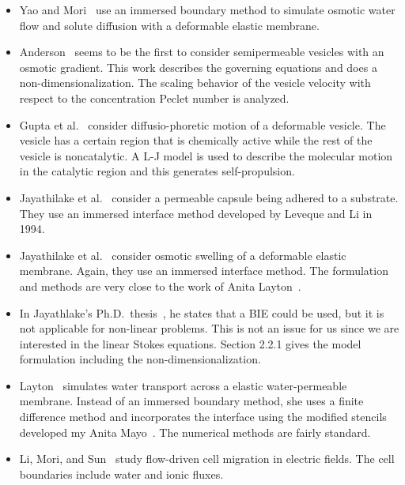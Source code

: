 \documentclass[twoside,twocolumn,9pt]{article}
\begin{document}
\begin{itemize}
  \item Yao and Mori~\cite{yao-mor2017} use an immersed boundary method
    to simulate osmotic water flow and solute diffusion with a
    deformable elastic membrane.

  \item Anderson~\cite{and1983} seems to be the first to consider
    semipermeable vesicles with an osmotic gradient. This work describes
    the governing equations and does a non-dimensionalization. The
    scaling behavior of the vesicle velocity with respect to the
    concentration Peclet number is analyzed.

  \item Gupta et al.~\cite{gup-sre-tha2015} consider diffusio-phoretic
    motion of a deformable vesicle. The vesicle has a certain region
    that is chemically active while the rest of the vesicle is
    noncatalytic. A L-J model is used to describe the molecular motion
    in the catalytic region and this generates self-propulsion.

  \item Jayathilake et al.~\cite{jay-kho-tan2010} consider a permeable
    capsule being adhered to a substrate. They use an immersed interface
    method developed by Leveque and Li in 1994.

  \item Jayathilake et al.~\cite{jay-tan-kho-wij2010} consider osmotic
    swelling of a deformable elastic membrane. Again, they use an
    immersed interface method. The formulation and methods are very
    close to the work of Anita Layton~\cite{lay2006}.

  \item In Jayathlake's Ph.D.~thesis~\cite{jay2010}, he states that a
    BIE could be used, but it is not applicable for non-linear problems.
    This is not an issue for us since we are interested in the linear
    Stokes equations. Section 2.2.1 gives the model formulation
    including the non-dimensionalization.

  \item Layton~\cite{lay2006} simulates water transport across a
    elastic water-permeable membrane. Instead of an immersed boundary
    method, she uses a finite difference method and incorporates the
    interface using the modified stencils developed my Anita
    Mayo~\cite{may1984}.  The numerical methods are fairly standard.

  \item Li, Mori, and Sun~\cite{li-mor-sun2015} study flow-driven cell
    migration in electric fields.  The cell boundaries include water and
    ionic fluxes.


\end{itemize}
\end{document}
